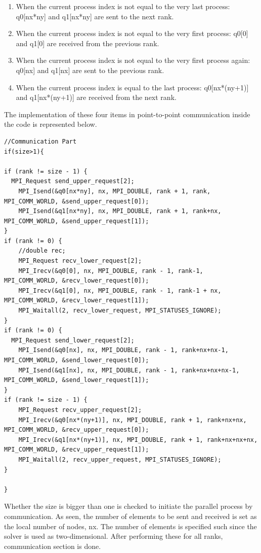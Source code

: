 \documentclass{article}
\begin{document}
\begin{enumerate}
\color{black}
\item When the current process index is not equal to the very last process: q0[nx*ny] and q1[nx*ny] are sent to the next rank.
\label{item_1}
\item When the current process index is not equal to the very first process: q0[0] and q1[0] are received from the previous rank.  
\label{item_2}
\item When the current process index is not equal to the very first process again: q0[nx] and q1[nx] are sent to the previous rank. 
\label{item_3}
\item When the current process index is equal to the last process: q0[nx*(ny+1)] and q1[nx*(ny+1)] are received from the next rank. 
\label{item_4}
\end{enumerate}
The implementation of these four items in point-to-point communication inside the code is represented below. \\

\begin{verbatim}
//Communication Part 
if(size>1){

if (rank != size - 1) {
  MPI_Request send_upper_request[2];
    MPI_Isend(&q0[nx*ny], nx, MPI_DOUBLE, rank + 1, rank, MPI_COMM_WORLD, &send_upper_request[0]);
    MPI_Isend(&q1[nx*ny], nx, MPI_DOUBLE, rank + 1, rank+nx, MPI_COMM_WORLD, &send_upper_request[1]);
}
if (rank != 0) {
    //double rec;
    MPI_Request recv_lower_request[2];
    MPI_Irecv(&q0[0], nx, MPI_DOUBLE, rank - 1, rank-1, MPI_COMM_WORLD, &recv_lower_request[0]);
    MPI_Irecv(&q1[0], nx, MPI_DOUBLE, rank - 1, rank-1 + nx, MPI_COMM_WORLD, &recv_lower_request[1]);
    MPI_Waitall(2, recv_lower_request, MPI_STATUSES_IGNORE);
}
if (rank != 0) {
  MPI_Request send_lower_request[2];
    MPI_Isend(&q0[nx], nx, MPI_DOUBLE, rank - 1, rank+nx+nx-1, MPI_COMM_WORLD, &send_lower_request[0]);
    MPI_Isend(&q1[nx], nx, MPI_DOUBLE, rank - 1, rank+nx+nx+nx-1, MPI_COMM_WORLD, &send_lower_request[1]);
}
if (rank != size - 1) {
    MPI_Request recv_upper_request[2];
    MPI_Irecv(&q0[nx*(ny+1)], nx, MPI_DOUBLE, rank + 1, rank+nx+nx, MPI_COMM_WORLD, &recv_upper_request[0]);
    MPI_Irecv(&q1[nx*(ny+1)], nx, MPI_DOUBLE, rank + 1, rank+nx+nx+nx, MPI_COMM_WORLD, &recv_upper_request[1]);
    MPI_Waitall(2, recv_upper_request, MPI_STATUSES_IGNORE);
}

}
\end{verbatim}
Whether the size is bigger than one is checked to initiate the parallel process by communication. As seen, the number of elements to be sent and received is set as the local number of nodes, nx. The number of elements is specified such since the solver is used as two-dimensional. After performing these for all ranks, communication section is done. \\
\end{document}
